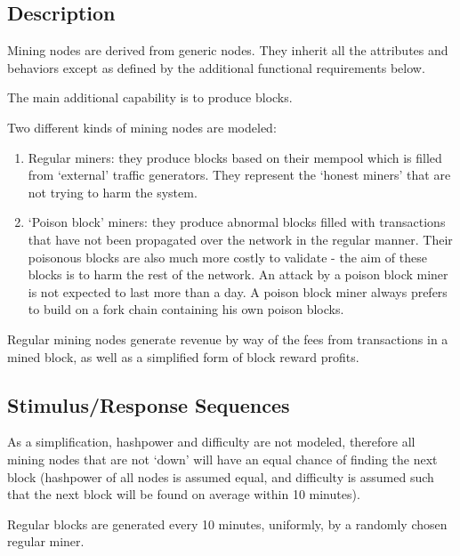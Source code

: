 \documentclass{scrreprt}
\begin{document}
    \subsection{Description}

      Mining nodes are derived from generic nodes.
      They inherit all the attributes and behaviors except as defined by the
      additional functional requirements below.

      The main additional capability is to produce blocks.

      Two different kinds of mining nodes are modeled:

      \begin{enumerate}
        \item Regular miners: they produce blocks based on their mempool which
          is filled from `external' traffic generators.
          They represent the `honest miners' that are not trying to harm
          the system.
        \item `Poison block' miners: they produce abnormal blocks filled with
          transactions that have not been propagated over the network in the
          regular manner.
          Their poisonous blocks are also much more costly to validate - the
          aim of these blocks is to harm the rest of the network.
          An attack by a poison block miner is not expected to last more than a day.
          A poison block miner always prefers to build on a fork chain containing his own
          poison blocks.
      \end{enumerate}

      Regular mining nodes generate revenue by way of the fees from
      transactions in a mined block, as well as a simplified form of
      block reward profits.

    \subsection{Stimulus/Response Sequences}

      As a simplification, hashpower and difficulty are not modeled, therefore
      all mining nodes that are not `down' will have an equal chance of finding
      the next block (hashpower of all nodes is assumed equal, and difficulty
      is assumed such that the next block will be found on average within 10
      minutes).

      Regular blocks are generated every 10 minutes, uniformly, by a randomly
      chosen regular miner.
\end{document}
